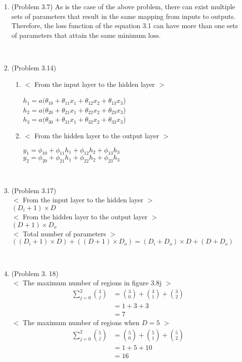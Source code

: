 \documentclass[10pt]{article}
\begin{document}
\begin{enumerate}
\item (Problem 3.7)
As is the case of the above problem, there can exist multiple sets of parameters that result in the same mapping from inputs to outputs. Therefore, the loss function of the equation 3.1 can have more than one sets of parameters that attain the same minimum loss.

\

\item (Problem 3.14) \\
\begin{enumerate}[label=(\alph*)]
	\item $<$ From the input layer to the hidden layer $>$

	$h_1=a(\theta_{10}+\theta_{11}x_1+\theta_{12}x_2+\theta_{13}x_3$) \\
	$h_2=a(\theta_{20}+\theta_{21}x_1+\theta_{22}x_2+\theta_{23}x_3$) \\
	$h_3=a(\theta_{30}+\theta_{31}x_1+\theta_{32}x_2+\theta_{33}x_3$)
	
	\item $<$ From the hidden layer to the output layer $>$
	
	$y_1=\phi_{10}+\phi_{11}h_1+\phi_{12}h_2+\phi_{13}h_3$ \\
	$y_2=\phi_{20}+\phi_{21}h_1+\phi_{22}h_2+\phi_{23}h_3$

	\end{enumerate}

\

\item (Problem 3.17) \\
	$<$ From the input layer to the hidden layer $>$ \\
	$(D_i+1) \times D$ \\
	$<$ From the hidden layer to the output layer $>$ \\
	$(D+1) \times D_o$ \\
	$<$ Total number of parameters $>$ \\
	$((D_i+1) \times D)+((D+1) \times D_o)=(D_i+D_o) \times D+(D+D_o)$

\

\item (Problem 3. 18) \\
	$<$ The maximum number of regions in figure 3.8j $>$ \\
	\begin{align*}
	\sum_{j=0}^{2}{3 \choose j} &= {3 \choose 0}+{3 \choose 1}+{3 \choose 2} \\
	&= 1+3+3 \\
	&= 7
	\end{align*}
	$<$ The maximum number of regions when $D=5$ $>$ \\
	\begin{align*}
	\sum_{j=0}^{2}{5 \choose j} &= {5 \choose 0}+{5 \choose 1}+{5 \choose 2} \\
	&= 1+5+10 \\
	&= 16
	\end{align*}

\end{enumerate}
\end{document}
